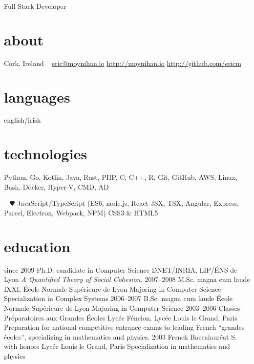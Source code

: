 \documentclass[]{friggeri-cv}
\begin{document}
       {Full Stack Developer}


\begin{aside}
  \section{about}
    Cork,
    Ireland
    ~
    \href{mailto:eric@moynihan.io}{eric@moynihan.io}
    \href{http://moynihan.io}{http://moynihan.io}
    \href{http://github.com/ericm}{http://github.com/ericm}
  \section{languages}
    english/irish
  \section{technologies}
    Python, Go, Kotlin,
    Java, Rust, PHP,
    C, C++, R,
    Git, GitHub, AWS,
    Linux, Bash, Docker,
    Hyper-V, CMD, AD
    
    ~
    {\color{red} $\varheartsuit$} JavaScript/TypeScript
    (ES6, node.js, React JSX, TSX, Angular, Express, Parcel, Electron, Webpack, NPM)
    CSS3 \& HTML5
    
\end{aside}



\section{education}

\begin{entrylist}
  \entry
    {since 2009}
    {Ph.D. {\normalfont candidate in Computer Science}}
    {DNET/INRIA, LIP/ÉNS de Lyon}
    {\emph{A Quantified Theory of Social Cohesion.}}
  \entry
    {2007–2008}
    {M.Sc. magna cum laude}
    {IXXI, École Normale Supérieure de Lyon}
    {Majoring in Computer Science\\
    Specialization in Complex Systems}
  \entry
    {2006–2007}
    {B.Sc. magna cum laude}
    {École Normale Supérieure de Lyon}
    {Majoring in Computer Science}
  \entry
    {2003–2006}
    {Classes Préparatoires aux Grandes Écoles}
    {Lycée Fénelon, Lycée Louis le Grand, Paris}
    {Preparation for national competitive entrance exams to leading French ``grandes écoles'', specializing in mathematics and physics.}
  \entry
    {2003}
    {French Baccalauréat S. with honors}
    {Lycée Louis le Grand, Paris}
    {Specialization in mathematics and physics}
\end{entrylist}
\end{document}

